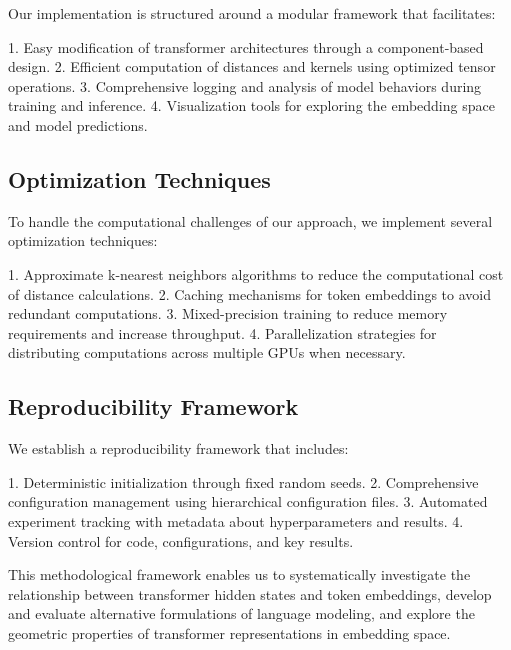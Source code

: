 Our implementation is structured around a modular framework that facilitates:

1. Easy modification of transformer architectures through a component-based design.
2. Efficient computation of distances and kernels using optimized tensor operations.
3. Comprehensive logging and analysis of model behaviors during training and inference.
4. Visualization tools for exploring the embedding space and model predictions.

\subsection{Optimization Techniques}

To handle the computational challenges of our approach, we implement several optimization techniques:

1. Approximate k-nearest neighbors algorithms to reduce the computational cost of distance calculations.
2. Caching mechanisms for token embeddings to avoid redundant computations.
3. Mixed-precision training to reduce memory requirements and increase throughput.
4. Parallelization strategies for distributing computations across multiple GPUs when necessary.

\subsection{Reproducibility Framework}

We establish a reproducibility framework that includes:

1. Deterministic initialization through fixed random seeds.
2. Comprehensive configuration management using hierarchical configuration files.
3. Automated experiment tracking with metadata about hyperparameters and results.
4. Version control for code, configurations, and key results.

This methodological framework enables us to systematically investigate the relationship between transformer hidden states and token embeddings, develop and evaluate alternative formulations of language modeling, and explore the geometric properties of transformer representations in embedding space.

